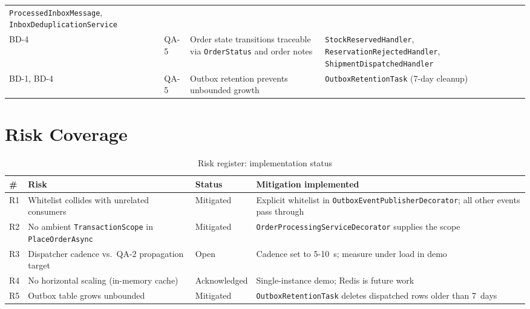 {\begin{longtable}{@{} L{1.2cm} L{1.5cm} L{5.0cm} L{6.8cm} @{}}
  \texttt{ProcessedInboxMessage},\newline
  \texttt{InboxDeduplicationService} \\
\addlinespace
BD-4 & QA-5 & Order state transitions traceable via \texttt{OrderStatus} and order notes &
  \texttt{StockReservedHandler},\newline
  \texttt{ReservationRejectedHandler},\newline
  \texttt{ShipmentDispatchedHandler} \\
\addlinespace
BD-1, BD-4 & QA-5 & Outbox retention prevents unbounded growth &
  \texttt{OutboxRetentionTask} (7-day cleanup) \\

\end{longtable}
}

\section{Risk Coverage}

\begin{table}[H]
\centering
\caption{Risk register: implementation status}
\label{tab:risks}
\small
\begin{tabularx}{\textwidth}{@{} C{1cm} L{4.2cm} L{2.8cm} X @{}}
\toprule
\textbf{\#} & \textbf{Risk} & \textbf{Status} & \textbf{Mitigation implemented} \\
\midrule
R1 & Whitelist collides with unrelated consumers & Mitigated & Explicit whitelist in \texttt{OutboxEventPublisherDecorator}; all other events pass through \\
R2 & No ambient \texttt{TransactionScope} in \texttt{PlaceOrderAsync} & Mitigated & \texttt{OrderProcessingServiceDecorator} supplies the scope \\
R3 & Dispatcher cadence vs.\ QA-2 propagation target & Open & Cadence set to 5-10~s; measure under load in demo \\
R4 & No horizontal scaling (in-memory cache) & Acknowledged & Single-instance demo; Redis is future work \\
R5 & Outbox table grows unbounded & Mitigated & \texttt{OutboxRetentionTask} deletes dispatched rows older than 7~days \\
\bottomrule
\end{tabularx}
\end{table}
